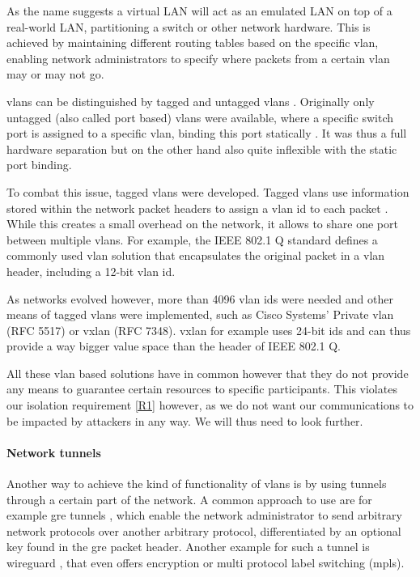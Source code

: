 As the name suggests a virtual LAN will act as an emulated LAN on top of a real-world LAN, partitioning a switch or other network hardware. This is achieved by maintaining different routing tables based on the specific \acrshort{vlan}, enabling network administrators to specify where packets from a certain \acrshort{vlan} may or may not go.

\acrshort{vlan}s can be distinguished by tagged and untagged \acrshort{vlan}s \cite[25.2]{IEEE8021Q}. Originally only untagged (also called port based) \acrshort{vlan}s were available, where a specific switch port is assigned to a specific \acrshort{vlan}, binding this port statically \cite[25.3]{IEEE8021Q}. It was thus a full hardware separation but on the other hand also quite inflexible with the static port binding.

To combat this issue, tagged \acrshort{vlan}s were developed. Tagged \acrshort{vlan}s use information stored within the network packet headers to assign a \acrshort{vlan} id to each packet \cite{IEEE8021Q}. While this creates a small overhead on the network, it allows to share one port between multiple \acrshort{vlan}s. For example, the IEEE 802.1 Q standard defines a commonly used \acrshort{vlan} solution that encapsulates the original packet in a \acrshort{vlan} header, including a 12-bit \acrshort{vlan} id.

As networks evolved however, more than 4096 \acrshort{vlan} ids were needed and other means of tagged \acrshort{vlan}s were implemented, such as Cisco Systems' Private \acrshort{vlan} (RFC 5517) \cite{rfc5517} or \acrshort{vxlan} (RFC 7348). \acrshort{vxlan} for example uses 24-bit ids and can thus provide a way bigger value space than the header of IEEE 802.1 Q.

All these \acrshort{vlan} based solutions have in common however that they do not provide any means to guarantee certain resources to specific participants. This violates our isolation requirement \ref{R1} however, as we do not want our communications to be impacted by attackers in any way. We will thus need to look further.

\paragraph{Network tunnels} Another way to achieve the kind of functionality of \acrshort{vlan}s is by using tunnels through a certain part of the network. A common approach to use are for example \acrshort{gre} tunnels \cite{rfc2784}, which enable the network administrator to send arbitrary network protocols over another arbitrary protocol, differentiated by an optional key found in the \acrshort{gre} packet header. Another example for such a tunnel is \gls{wireguard} \cite{wireguard}, that even offers encryption or multi protocol label switching (\acrshort{mpls}).

